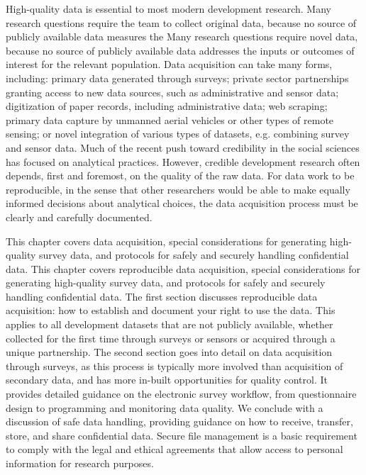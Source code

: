 
\begin{fullwidth}
High-quality data is essential to most modern development research.
Many research questions require the team to collect original data,
because no source of publicly available data measures the
Many research questions require novel data,
because no source of publicly available data addresses the
inputs or outcomes of interest for the relevant population.
Data acquisition can take many forms, including:
primary data generated through surveys;
private sector partnerships granting access to new data sources, such as administrative and sensor data;
digitization of paper records, including administrative data; web scraping;
primary data capture by unmanned aerial vehicles or other types of remote sensing;
or novel integration of various types of datasets, e.g. combining survey and sensor data.
Much of the recent push toward credibility in the social sciences has focused on analytical practices.
However, credible development research often depends, first and foremost, on the quality of the raw data.
For data work to be reproducible,
in the sense that other researchers would be able to make
equally informed decisions about analytical choices,
the data acquisition process must be clearly and carefully documented.

This chapter covers data acquisition,
special considerations for generating high-quality survey data,
and protocols for safely and securely handling confidential data.
This chapter covers reproducible data acquisition,
special considerations for generating high-quality survey data,
and protocols for safely and securely handling confidential data.
The first section discusses reproducible data acquisition:
how to establish and document your right to use the data.
This applies to all development datasets that are not publicly available,
whether collected for the first time through surveys or sensors or acquired through a unique partnership.
The second section goes into detail on data acquisition through surveys,
as this process is typically more involved than acquisition of secondary data,
and has more in-built opportunities for quality control.
It provides detailed guidance on the electronic survey workflow,
from questionnaire design to programming and monitoring data quality.
We conclude with a discussion of safe data handling,
providing guidance on how to receive, transfer, store, and share confidential data.
Secure file management is a basic requirement to comply with the legal and
ethical agreements that allow  access to personal information for research purposes.


\end{fullwidth}


